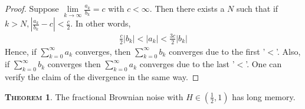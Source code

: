 \documentclass[a4paper, twoside, 11pt]{article}
\theoremstyle{definition}
\newtheorem{theorem}[definition]{\scshape Theorem}
\begin{document}
  \begin{proof}
	Suppose $\lim\limits_{k\rightarrow \infty}\frac{a_k}{b_k}=c$ with $c<\infty$. Then there exists a $N$ such that if $k > N, |\frac{a_k}{b_k} - c| < \frac{c}{2}$. In other words, 
	\begin{eqnarray*}
	  \frac{c}{2}|b_k| < |a_k| < \frac{3c}{2}|b_k|
	\end{eqnarray*}
	Hence, if $\sum_{k=0}^{\infty} a_k$ converges, then $\sum_{k=0}^{\infty} b_k$ converges due to the first '$<$'. Also, if $\sum_{k=0}^{\infty} b_k$ converges then $\sum_{k=0}^{\infty} a_k$ converges due to the last '$<$'. One can verify the claim of the divergence in the same way.
  \end{proof}
  \begin{theorem}
	The fractional Brownian noise with $H \in (\frac{1}{2}, 1)$ has long memory.
	\label{sec:lmemory}
  \end{theorem}
\end{document}
